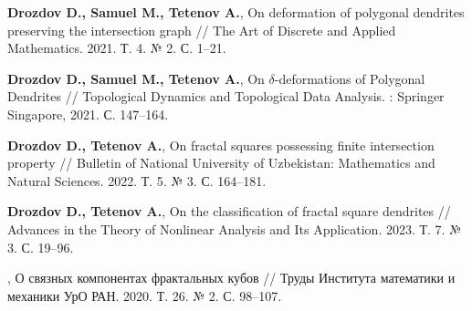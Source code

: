 \begin{thebibliography}{99}
    
\bigskip \bigskip


\bigskip \bigskip

{\bf Drozdov D., Samuel M., Tetenov A.},
On deformation of polygonal dendrites preserving the intersection graph //
The Art of Discrete and Applied Mathematics. 2021. Т. 4. № 2. С. 1--21.

{\bf Drozdov D., Samuel M., Tetenov A.}, 
On $\delta$-deformations of Polygonal Dendrites // 
Topological Dynamics and Topological Data Analysis. : Springer Singapore, 2021. С. 147--164.

{\bf Drozdov D., Tetenov A.}, 
On fractal squares possessing finite intersection property // 
Bulletin of National University of Uzbekistan: Mathematics and Natural Sciences. 2022. Т. 5. № 3. С. 164--181.

{\bf Drozdov D., Tetenov A.}, 
On the classification of fractal square dendrites // 
Advances in the Theory of Nonlinear Analysis and Its Application. 2023. Т. 7. № 3. С. 19--96.

,
О связных компонентах фрактальных кубов // 
Труды Института математики и механики УрО РАН. 2020. Т. 26. № 2. С. 98--107.


\end{thebibliography}